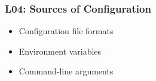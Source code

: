 \begin{frame}
	\frametitle{L04: Sources of Configuration}

	\begin{itemize}
	\item Configuration file formats
	\item Environment variables
	\item Command-line arguments
	\end{itemize}
\end{frame}

\appendix

\begin{frame}[allowframebreaks]
	
	
\end{frame}



